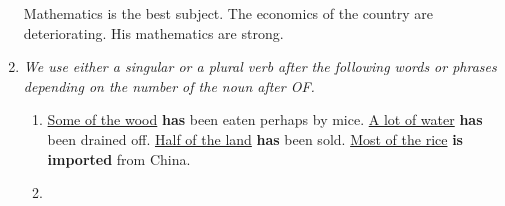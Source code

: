 \begin{enumerate}
        \newline
        \newline
        Mathematics is the best subject.
        \newline
        \newline
        The economics of the country are deteriorating.
        \newline
        \newline
        His mathematics are strong.
    \item
        {\it
        We use either a singular or a plural verb after the following words or
        phrases depending on the number of the noun after OF.
        }
        \begin{enumerate}
            \item
                \newline
                \newline
                \underline{Some of the wood} \textbf{has} been eaten perhaps by mice.
                \newline
                \newline
                \underline{A lot of water} \textbf{has} been drained off.
                \newline
                \newline
                \underline{Half of the land} \textbf{has} been sold.
                \newline
                \newline
                \underline{Most of the rice} \textbf{is imported} from China.
            \item
\end{enumerate}
\end{enumerate}
